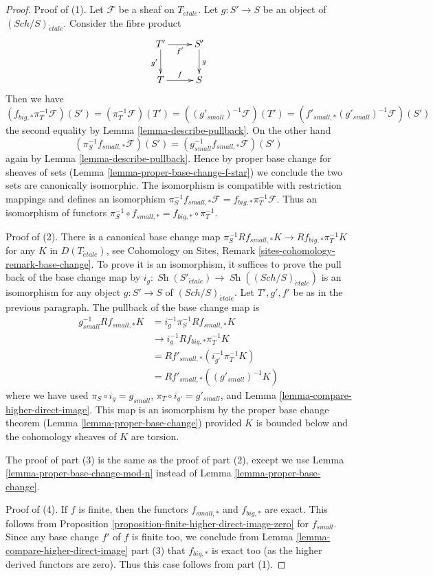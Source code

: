 \documentclass[10pt,a4paper]{amsart}
\theoremstyle{plain}
\theoremstyle{definition}
\theoremstyle{remark}
\numberwithin{equation}{subsection}
\def\Sch{\mathit{Sch}}
\def\Sh{\mathop{\mathit{Sh}}\nolimits}
\def\etale{{\acute{e}tale}}
\begin{document}
\begin{proof}
Proof of (1). Let $\mathcal{F}$ be a sheaf on $T_\etale$.
Let $g : S' \to S$ be an object of $(\Sch/S)_\etale$. Consider the
fibre product
$$
\xymatrix{
T' \ar[r]_{f'} \ar[d]_{g'} & S' \ar[d]^g \\
T \ar[r]^f & S
}
$$
Then we have
$$
(f_{big, *}\pi_T^{-1}\mathcal{F})(S') =
(\pi_T^{-1}\mathcal{F})(T') =
((g'_{small})^{-1}\mathcal{F})(T')  =
(f'_{small, *}(g'_{small})^{-1}\mathcal{F})(S')
$$
the second equality by Lemma \ref{lemma-describe-pullback}.
On the other hand
$$
(\pi_S^{-1}f_{small, *}\mathcal{F})(S') =
(g_{small}^{-1}f_{small, *}\mathcal{F})(S')
$$
again by Lemma \ref{lemma-describe-pullback}.
Hence by proper base change for sheaves of sets
(Lemma \ref{lemma-proper-base-change-f-star})
we conclude the two sets are canonically isomorphic.
The isomorphism is compatible with restriction mappings
and defines an isomorphism
$\pi_S^{-1}f_{small, *}\mathcal{F} = f_{big, *}\pi_T^{-1}\mathcal{F}$.
Thus an isomorphism of functors
$\pi_S^{-1} \circ f_{small, *} = f_{big, *} \circ \pi_T^{-1}$.

\medskip\noindent
Proof of (2). There is a canonical base change map
$\pi_S^{-1}Rf_{small, *}K \to Rf_{big, *}\pi_T^{-1}K$
for any $K$ in $D(T_\etale)$, see
Cohomology on Sites, Remark \ref{sites-cohomology-remark-base-change}.
To prove it is an isomorphism, it suffices to prove the pull back of
the base change map by $i_g : \Sh(S'_\etale) \to \Sh((\Sch/S)_\etale)$
is an isomorphism for any object $g : S' \to S$ of $(\Sch/S)_\etale$.
Let $T', g', f'$ be as in the previous paragraph.
The pullback of the base change map is
\begin{align*}
g_{small}^{-1}Rf_{small, *}K
& =
i_g^{-1}\pi_S^{-1}Rf_{small, *}K \\
& \to
i_g^{-1}Rf_{big, *}\pi_T^{-1}K \\
& =
Rf'_{small, *}(i_{g'}^{-1}\pi_T^{-1}K) \\
& =
Rf'_{small, *}((g'_{small})^{-1}K)
\end{align*}
where we have used $\pi_S \circ i_g = g_{small}$,
$\pi_T \circ i_{g'} = g'_{small}$, and
Lemma \ref{lemma-compare-higher-direct-image}.
This map is an isomorphism by the proper base change theorem
(Lemma \ref{lemma-proper-base-change}) provided $K$ is bounded
below and the cohomology sheaves of $K$ are torsion.

\medskip\noindent
The proof of part (3) is the same as the proof of part (2), except
we use Lemma \ref{lemma-proper-base-change-mod-n}
instead of Lemma \ref{lemma-proper-base-change}.

\medskip\noindent
Proof of (4). If $f$ is finite, then the functors
$f_{small, *}$ and $f_{big, *}$ are exact. This follows
from Proposition \ref{proposition-finite-higher-direct-image-zero}
for $f_{small}$. Since any base change $f'$ of $f$ is finite too,
we conclude from Lemma \ref{lemma-compare-higher-direct-image} part (3)
that $f_{big, *}$ is exact too (as the higher derived functors are zero).
Thus this case follows from part (1).
\end{proof}
\end{document}
